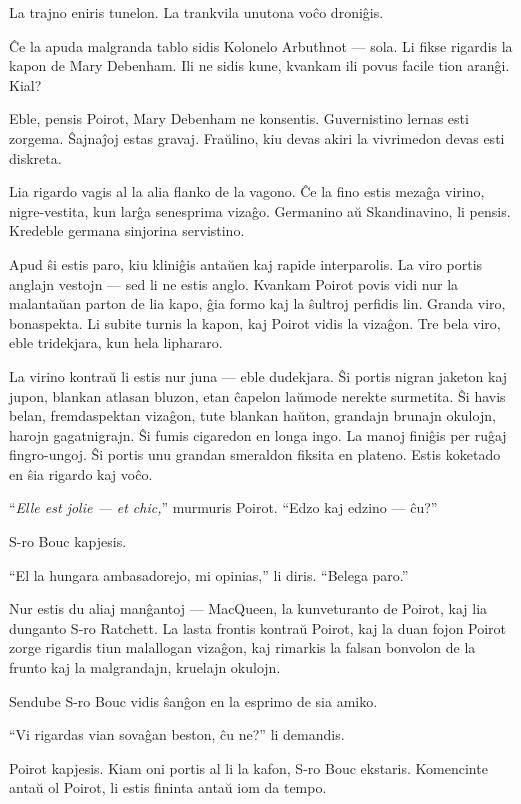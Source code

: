La trajno eniris tunelon. La trankvila unutona voĉo droniĝis.

Ĉe la apuda malgranda tablo sidis Kolonelo Arbuthnot --- sola. Li fikse rigardis la kapon de Mary Debenham. Ili ne sidis kune, kvankam ili povus facile tion aranĝi. Kial?

Eble, pensis Poirot, Mary Debenham ne konsentis. Guvernistino lernas esti zorgema. Ŝajnaĵoj estas gravaj. Fraŭlino, kiu devas akiri la vivrimedon devas esti diskreta.

Lia rigardo vagis al la alia flanko de la vagono. Ĉe la fino estis mezaĝa virino, nigre-vestita, kun larĝa senesprima vizaĝo. Germanino aŭ Skandinavino, li pensis. Kredeble germana sinjorina servistino.

Apud ŝi estis paro, kiu kliniĝis antaŭen kaj rapide interparolis. La viro portis anglajn vestojn --- sed li ne estis anglo. Kvankam Poirot povis vidi nur la malantaŭan parton de lia kapo, ĝia formo kaj la ŝultroj perfidis lin. Granda viro, bonaspekta. Li subite turnis la kapon, kaj Poirot vidis la vizaĝon. Tre bela viro, eble tridekjara, kun hela liphararo.

La virino kontraŭ li estis nur juna --- eble dudekjara. Ŝi portis nigran jaketon kaj jupon, blankan atlasan bluzon, etan ĉapelon laŭmode nerekte surmetita. Ŝi havis belan, fremdaspektan vizaĝon, tute blankan haŭton, grandajn brunajn okulojn, harojn gagatnigrajn. Ŝi fumis cigaredon en longa ingo. La manoj finiĝis per ruĝaj fingro-ungoj. Ŝi portis unu grandan smeraldon fiksita en plateno. Estis koketado en ŝia rigardo kaj voĉo.

``\emph{Elle est jolie --- et chic,}'' murmuris Poirot. ``Edzo kaj edzino --- ĉu?''

S-ro Bouc kapjesis.

``El la hungara ambasadorejo, mi opinias,'' li diris. ``Belega paro.''

Nur estis du aliaj manĝantoj --- MacQueen, la kunveturanto de Poirot, kaj lia dunganto S-ro Ratchett. La lasta frontis kontraŭ Poirot, kaj la duan fojon Poirot zorge rigardis tiun malallogan vizaĝon, kaj rimarkis la falsan bonvolon de la frunto kaj la malgrandajn, kruelajn okulojn.

Sendube S-ro Bouc vidis ŝanĝon en la esprimo de sia amiko.

``Vi rigardas vian sovaĝan beston, ĉu ne?'' li demandis.

Poirot kapjesis. Kiam oni portis al li la kafon, S-ro Bouc ekstaris. Komencinte antaŭ ol Poirot, li estis fininta antaŭ iom da tempo.

